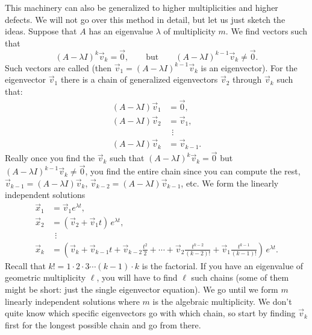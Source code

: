 \documentclass{ximera}
\begin{document}
This machinery can also be generalized to higher multiplicities and higher defects. We will not go over this method in detail, but let us just sketch the ideas.  Suppose that $A$ has an eigenvalue $\lambda$ of multiplicity $m$. We find vectors such that
\begin{equation*}
    {(A - \lambda I)}^k \vec{v}_k = \vec{0}, \qquad \text{but} \qquad {(A - \lambda I)}^{k-1} \vec{v}_k \not= \vec{0}.
\end{equation*}
Such vectors are called \emph{} (then $\vec{v}_1 = {(A - \lambda I)}^{k-1} \vec{v}_k$ is an eigenvector). For the eigenvector $\vec{v}_1$ there is a chain of generalized eigenvectors $\vec{v}_2$ through $\vec{v}_k$ such that:
\begin{align*}
    (A - \lambda I) \vec{v}_1 & = \vec{0} , \\
    (A - \lambda I) \vec{v}_2 & = \vec{v}_1 , \\
    & ~~\vdots \\
    (A - \lambda I) \vec{v}_k & = \vec{v}_{k-1} .
\end{align*}
Really once you find the $\vec{v}_k$ such that ${(A - \lambda I)}^k \vec{v}_k = \vec{0}$ but ${(A - \lambda I)}^{k-1} \vec{v}_k \not= \vec{0}$, you find the entire chain since you can compute the rest, $\vec{v}_{k-1} = (A - \lambda I) \vec{v}_k$, $\vec{v}_{k-2} = (A - \lambda I) \vec{v}_{k-1}$, etc. We form the linearly independent solutions
\begin{align*}
    \vec{x}_1 & = \vec{v}_1 e^{\lambda t} , \\
    \vec{x}_2 & = ( \vec{v}_2 + \vec{v}_1 t ) \, e^{\lambda t} , \\
    & ~~\vdots \\
    \vec{x}_k & = \left( \vec{v}_k + \vec{v}_{k-1} t + \vec{v}_{k-2} \frac{t^2}{2} + \cdots + \vec{v}_2 \frac{t^{k-2}}{(k-2)!} + \vec{v}_1 \frac{t^{k-1}}{(k-1)!} \right) \, e^{\lambda t} .
\end{align*}
Recall that $k! = 1 \cdot 2 \cdot 3 \cdots (k-1) \cdot k$ is the factorial. If you have an eigenvalue of geometric multiplicity $\ell$, you will have to find $\ell$ such chains (some of them might be short: just the single eigenvector equation). We go until we form $m$ linearly independent solutions where $m$ is the algebraic multiplicity. We don't quite know which specific eigenvectors go with which chain, so start by finding $\vec{v}_k$ first for the longest possible chain and go from there.
\end{document}
